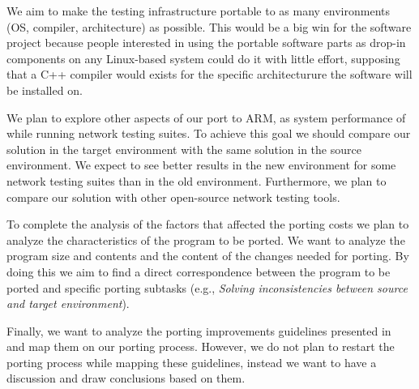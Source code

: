 We aim to make the testing infrastructure portable to as many environments (OS,
compiler, architecture) as possible. This would be a big win for the software
project because people interested in using the portable software parts as
drop-in components on any Linux-based system could do it with little effort,
supposing that a C++ compiler would exists for the specific architecturure the
software will be installed on.

We plan to explore other aspects of our port to ARM, as system performance of
while running network testing suites.  To achieve this goal we should compare
our solution in the target environment with the same solution in the source
environment. We expect to see better results in the new environment for some
network testing suites than in the old environment. Furthermore, we plan to
compare our solution with other open-source network testing tools.~ 

To complete the analysis of the factors that affected the porting costs we plan
to analyze the characteristics of the program to be ported. We want to analyze
the program size and contents and the content of the changes needed for porting.
By doing this we aim to find a direct correspondence between the program to be
ported and specific porting subtasks (e.g., \textit{Solving inconsistencies
between source and target environment}).

Finally, we want to analyze the porting improvements guidelines presented
in~\cite{hakuta} and map them on our porting process. However, we do not plan to
restart the porting process while mapping these guidelines, instead we want to
have a discussion and draw conclusions based on them.
